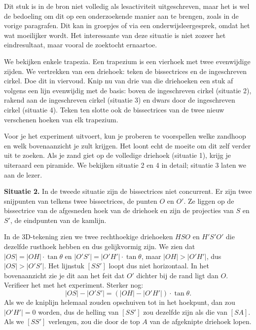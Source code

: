 \documentclass{ximera}
\begin{document}
\author{Alexander Holvoet}

\begin{instructorNotes}
    Dit stuk is in de bron niet volledig als lesactiviteit uitgeschreven, maar het is wel
    de bedoeling om dit op een onderzoekende manier aan te brengen, zoals in de vorige
    paragrafen. Dit kan in groepjes of via een onderwijsleergesprek, omdat het wat
    moeilijker wordt. Het interessante van deze situatie is niet zozeer het eindresultaat,
    maar vooral de zoektocht ernaartoe.
\end{instructorNotes}

We bekijken enkele trapezia. Een trapezium is een vierhoek met twee evenwijdige zijden.
We vertrekken van een driehoek: teken de bissectrices en de ingeschreven cirkel. Doe dit
in viervoud. Knip nu van drie van die driehoeken een stuk af volgens een lijn evenwijdig
met de basis: boven de ingeschreven cirkel (situatie 2), rakend aan de ingeschreven cirkel
(situatie 3) en dwars door de ingeschreven cirkel (situatie 4). Teken ten slotte ook de
bissectrices van de twee nieuw verschenen hoeken van elk trapezium.


Voor je het experiment uitvoert, kun je proberen te voorspellen welke zandhoop en welk
bovenaanzicht je zult krijgen. Het loont echt de moeite om dit zelf verder uit te zoeken.
Als je zand giet op de volledige driehoek (situatie 1), krijg je uiteraard een piramide.
We bekijken situatie 2 en 4 in detail; situatie 3 laten we aan de lezer.

\textbf{Situatie 2.} In de tweede situatie zijn de bissectrices niet concurrent. Er zijn
twee snijpunten van telkens twee bissectrices, de punten \(O\) en \(O'\). Ze liggen op de
bissectrice van de afgesneden hoek van de driehoek en zijn de projecties van \(S\) en
\(S'\), de eindpunten van de kamlijn.

In de 3D-tekening zien we twee rechthoekige driehoeken \(HSO\) en \(H'S'O'\) die dezelfde
rusthoek hebben en dus gelijkvormig zijn. We zien dat \(|OS| = |OH|\cdot \tan\theta\) en
\(|O'S'| = |O'H'|\cdot \tan\theta\), maar \(|OH| > |O'H'|\), dus \(|OS| > |O'S'|\). Het
lijnstuk \([SS']\) loopt dus niet horizontaal. In het bovenaanzicht zie je dit aan het feit
dat \(O'\) dichter bij de rand ligt dan \(O\). Verifieer het met het experiment. Sterker
nog:
\[
    |OS| - |O'S'| = (|OH| - |O'H'|)\cdot \tan\theta .
\]
Als we de kniplijn helemaal zouden opschuiven tot in het hoekpunt, dan zou \(|O'H'| = 0\)
worden, dus de helling van \([SS']\) zou dezelfde zijn als die van \([SA]\). Als we
\([SS']\) verlengen, zou die door de top \(A\) van de afgeknipte driehoek lopen.
\end{document}
